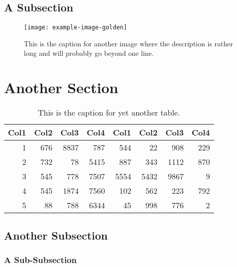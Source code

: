 \subsection{A Subsection}
    \lipsum[6-8]
    \begin{figure}
        \centering
        \texttt{[image: example-image-golden]}
        \captionsetup{width=4.5in}
        \caption{This is the caption for another image where the description is rather long and will probably go beyond one line.}
    \end{figure}

\section{Another Section}
    \lipsum[1-2]
    \begin{table}
        \centering
        \begin{tabular}{r r r r r r r r}
             Col1 & Col2 & Col3 & Col4 & Col1 & Col2 & Col3 & Col4 \\
             \hline
             1    & 676  & 8837 & 787  & 544  & 22   & 908  & 229  \\
             2    & 732  & 78   & 5415 & 887  & 343  & 1112 & 870  \\
             3    & 545  & 778  & 7507 & 5554 & 5432 & 9867 & 9    \\
             4    & 545  & 1874 & 7560 & 102  & 562  & 223  & 792  \\
             5    & 88   & 788  & 6344 & 45   & 998  & 776  & 2    \\
             \hline
        \end{tabular}
        \captionsetup{width=3.9in}
        \caption{This is the caption for yet another table.}
    \end{table}

\subsection{Another Subsection}
    \lipsum[3-5]

\subsubsection{A Sub-Subsection}
    \lipsum[6-8]
